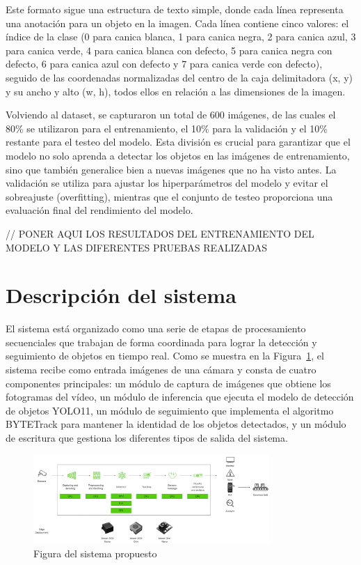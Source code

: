 \documentclass[11pt,spanish,listoffigures,listoftables]{tfgetsinf}
\begin{document}
Este formato sigue una estructura de texto simple, donde cada línea representa una anotación para un objeto en la imagen. Cada línea contiene cinco valores: el índice de la clase (0 para canica blanca, 1 para canica negra, 2 para canica azul, 3 para canica verde, 4 para canica blanca con defecto, 5 para canica negra con defecto, 6 para canica azul con defecto y 7 para canica verde con defecto), seguido de las coordenadas normalizadas del centro de la caja delimitadora (x, y) y su ancho y alto (w, h), todos ellos en relación a las dimensiones de la imagen.

Volviendo al dataset, se capturaron un total de 600 imágenes, de las cuales el 80\% se utilizaron para el entrenamiento, el 10\% para la validación y el 10\% restante para el testeo del modelo. Esta división es crucial para garantizar que el modelo no solo aprenda a detectar los objetos en las imágenes de entrenamiento, sino que también generalice bien a nuevas imágenes que no ha visto antes. La validación se utiliza para ajustar los hiperparámetros del modelo y evitar el sobreajuste (overfitting), mientras que el conjunto de testeo proporciona una evaluación final del rendimiento del modelo.

// PONER AQUI LOS RESULTADOS DEL ENTRENAMIENTO DEL MODELO Y LAS DIFERENTES PRUEBAS REALIZADAS


\section{Descripción del sistema}

El sistema está organizado como una serie de etapas de procesamiento secuenciales que trabajan de forma coordinada para lograr la detección y seguimiento de objetos en tiempo real. Como se muestra en la Figura~\ref{fig:sistema_propuesto}, el sistema recibe como entrada imágenes de una cámara y consta de cuatro componentes principales: un módulo de captura de imágenes que obtiene los fotogramas del vídeo, un módulo de inferencia que ejecuta el modelo de detección de objetos YOLO11, un módulo de seguimiento que implementa el algoritmo BYTETrack para mantener la identidad de los objetos detectados, y un módulo de escritura que gestiona los diferentes tipos de salida del sistema.

\begin{figure}[H]
   \centering
   \includegraphics[width=0.8\textwidth]{images/diseno_e_implementacion/figura_TFG_v2.png}
   \caption{Figura del sistema propuesto}
   \label{fig:sistema_propuesto}
\end{figure}
\end{document}
